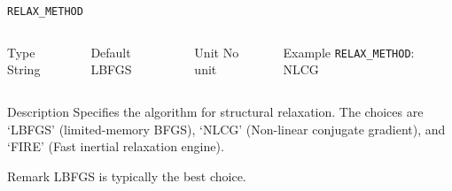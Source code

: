 \documentclass[xcolor=dvipsnames,t]{beamer}
\begin{document}
\begin{frame}[allowframebreaks]{\texttt{RELAX\_METHOD}} \label{RELAX_METHOD}
\vspace*{-12pt}
\begin{columns}
\begin{block}{Type}
String
\end{block}

\begin{block}{Default}
LBFGS
\end{block}

\begin{block}{Unit}
No unit
\end{block}

\begin{block}{Example}
\texttt{RELAX\_METHOD}: NLCG
\end{block}
\end{columns}

\begin{block}{Description}
Specifies the algorithm for structural relaxation. The choices are `LBFGS' (limited-memory BFGS), `NLCG' (Non-linear conjugate gradient), and `FIRE' (Fast inertial relaxation engine). 
\end{block}

\begin{block}{Remark}
LBFGS is typically the best choice.
\end{block}

\end{frame}
\end{document}
